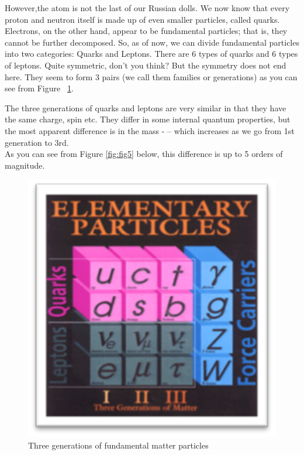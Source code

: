 However,the atom is not the last of our Russian dolls. We now know that every proton and neutron itself is made up of even smaller particles, called quarks. Electrons, on the other hand, appear to be fundamental particles; that is, they cannot be further decomposed. 
So, as of now, we can divide fundamental particles into two categories: Quarks and Leptons.  There are 6 types of quarks and 6 types of leptons. Quite symmetric, don't you think?  But the symmetry does not end here. They seem to form 3 pairs (we call them families or generations) as you can see from Figure ~\ref{fig:fig3}.

The three generations of quarks and leptons are very similar in that they have the same charge, spin etc. They differ in some internal quantum properties, but the most apparent difference is in the mass - – which increases as we go from 1st generation to 3rd. 
\\
As you can see from 
Figure \ref{fig:fig5} below, this difference is up to 5 orders of magnitude.


\begin{figure}[h]
\centering\includegraphics[scale=0.5]{./ElementaryParticles/Pictures/fig3.pdf}
\caption{Three generations of fundamental matter particles}
\label{fig:fig3}
\end{figure}


